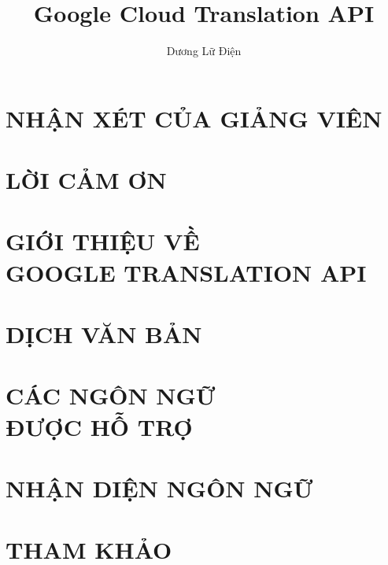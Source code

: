 \documentclass[a4paper,12pt,twoside,openright]{report}	%
\title{Google Cloud Translation API}	%
\author{Dương Lữ Điện}					%
\begin{document}

\chapter*{NHẬN XÉT CỦA GIẢNG VIÊN}


\chapter*{LỜI CẢM ƠN}

\tableofcontents
\listoffigures

\chapter{GIỚI THIỆU VỀ\\GOOGLE TRANSLATION API}

\chapter{DỊCH VĂN BẢN}


\chapter{CÁC NGÔN NGỮ\\ĐƯỢC HỖ TRỢ}


\chapter{NHẬN DIỆN NGÔN NGỮ}


\chapter*{THAM KHẢO}

\end{document}
